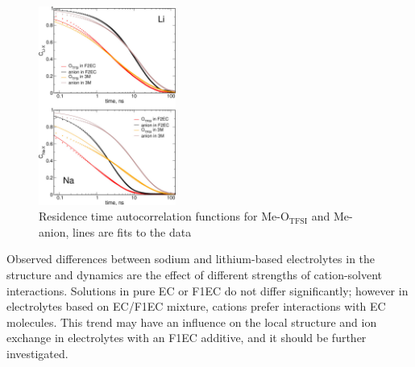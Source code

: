 \begin{figure}[H]
    \centering
    \includegraphics[width=0.4\textwidth]{img/3-structural-data-from-md-simulations/4-carbonates/figure4.png}
    \singlespacing
    \caption{Residence time autocorrelation functions for Me-O$_{\text{TFSI}}$ and Me-anion, lines are fits to the data}
    \label{fig:carbonates-figure-4}
\end{figure}

Observed differences between sodium and lithium-based electrolytes in the structure and dynamics are the effect of different strengths of cation-solvent interactions. Solutions in pure EC or F1EC do not differ significantly; however in electrolytes based on EC/F1EC mixture, cations prefer interactions with EC molecules. This trend may have an influence on the local structure and ion exchange in electrolytes with an F1EC additive, and it should be further investigated.

\cleardoublepage